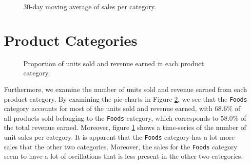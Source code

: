 \begin{figure}[b!]
    \centering
    \captionsetup{width=0.98\textwidth}
    \caption{30-day moving average of sales per category.}
    \label{fig:cat_sales}
\end{figure} 

\section{Product Categories}
\begin{figure}
    \vspace{-15pt}
    \centering
    \captionsetup{width=0.52\textwidth}
    \caption{Proportion of units sold and revenue earned in each product category.}
    \label{fig:sales_rev_cats}
    \vspace{-20pt}
\end{figure}
   
Furthermore, we examine the number of units sold and revenue earned from each product category.
By examining the pie charts in Figure \ref{fig:sales_rev_cats}, we see that the \texttt{Foods} category accounts for most of the units sold and revenue earned, with 68.6\% of all products sold belonging to the \texttt{Foods} category, which corresponds to 58.0\% of the total revenue earned.
Moreover, figure \ref{fig:cat_sales} shows a time-series of the number of unit sales per category.
It is apparent that the \texttt{Foods} category has a lot more sales that the other two categories.
Moreover, the sales for the \texttt{Foods} category seem to have a lot of oscillations that is less present in the other two categories.

